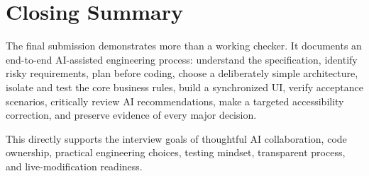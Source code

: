 \documentclass[11pt,a4paper]{article}
\begin{document}
\section{Closing Summary}
The final submission demonstrates more than a working checker. It documents an end-to-end AI-assisted engineering process: understand the specification, identify risky requirements, plan before coding, choose a deliberately simple architecture, isolate and test the core business rules, build a synchronized UI, verify acceptance scenarios, critically review AI recommendations, make a targeted accessibility correction, and preserve evidence of every major decision.

This directly supports the interview goals of thoughtful AI collaboration, code ownership, practical engineering choices, testing mindset, transparent process, and live-modification readiness.
\end{document}
